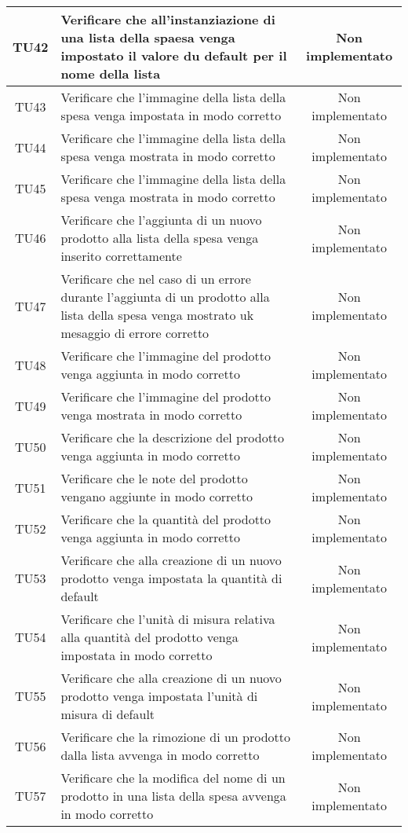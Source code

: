\begin{center}
\begin{longtable}{|c|>{\centering}m{10cm}|c|}
		TU42 & Verificare che all'instanziazione di una lista della spaesa venga impostato il valore du default per il nome della lista & Non implementato \\ \hline
		TU43 & Verificare che l'immagine della lista della spesa venga impostata in modo corretto & Non implementato \\ \hline
		TU44 & Verificare che l'immagine della lista della spesa venga mostrata in modo corretto & Non implementato \\ \hline
		TU45 & Verificare che l'immagine della lista della spesa venga mostrata in modo corretto & Non implementato \\ \hline
		TU46 & Verificare che l'aggiunta di un nuovo prodotto alla lista della spesa venga inserito correttamente & Non implementato \\ \hline
		TU47 & Verificare che nel caso di un errore durante l'aggiunta di un prodotto alla lista della spesa venga mostrato uk mesaggio di errore corretto & Non implementato \\ \hline
		TU48 & Verificare che l'immagine del prodotto venga aggiunta in modo corretto & Non implementato \\ \hline
		TU49 & Verificare che l'immagine del prodotto venga mostrata in modo corretto & Non implementato \\ \hline
		TU50 & Verificare che la descrizione del prodotto venga aggiunta in modo corretto & Non implementato \\ \hline
		TU51 & Verificare che le note del prodotto vengano aggiunte in modo corretto & Non implementato \\ \hline
		TU52 & Verificare che la quantità del prodotto venga aggiunta in modo corretto & Non implementato \\ \hline
		TU53 & Verificare che alla creazione di un nuovo prodotto venga impostata la quantità di default & Non implementato \\ \hline
		TU54 & Verificare che l'unità di misura relativa alla quantità del prodotto venga impostata in modo corretto & Non implementato \\ \hline
		TU55 & Verificare che alla creazione di un nuovo prodotto venga impostata l'unità di misura di default & Non implementato \\ \hline
		TU56 & Verificare che la rimozione di un prodotto dalla lista avvenga in modo corretto & Non implementato \\ \hline
		TU57 & Verificare che la modifica del nome di un prodotto in una lista della spesa avvenga in modo corretto & Non implementato \\ \hline

\end{longtable}
\end{center}
